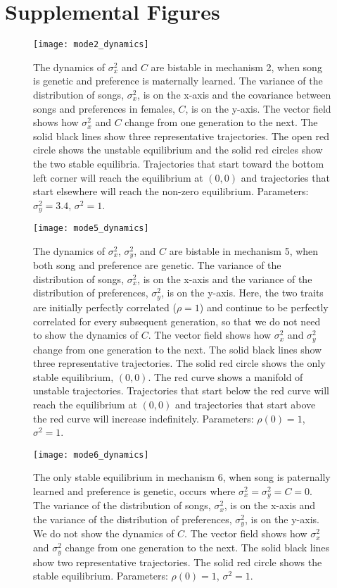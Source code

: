 \documentclass{article}
\begin{document}
\newpage
\section{Supplemental Figures}

\begin{figure}[ht]
\texttt{[image: mode2\_dynamics]}
\caption{\label{mode2} The dynamics of $\sigma_x^2$ and $C$ are bistable in mechanism 2, when song is genetic and preference is maternally learned. The variance of the distribution of songs, $\sigma_x^2$, is on the x-axis and the covariance between songs and preferences in females, $C$, is on the y-axis. The vector field shows how $\sigma_x^2$ and $C$ change from one generation to the next. The solid black lines show three representative trajectories. The open red circle shows the unstable equilibrium and the solid red circles show the two stable equilibria. Trajectories that start toward the bottom left corner will reach the equilibrium at $(0,0)$ and trajectories that start elsewhere will reach the non-zero equilibrium. Parameters: $\sigma_y^2=3.4$, $\sigma^2=1$.}
\end{figure}

\begin{figure}
\texttt{[image: mode5\_dynamics]}
\caption{\label{mode5}The dynamics of $\sigma_x^2$, $\sigma_y^2$, and $C$ are bistable in mechanism 5, when both song and preference are genetic. The variance of the distribution of songs, $\sigma_x^2$, is on the x-axis and the variance of the distribution of preferences, $\sigma_y^2$, is on the y-axis. Here, the two traits are initially perfectly correlated ($\rho=1$) and continue to be perfectly correlated for every subsequent generation, so that we do not need to show the dynamics of $C$. The vector field shows how $\sigma_x^2$ and $\sigma_y^2$ change from one generation to the next. The solid black lines show three representative trajectories. The solid red circle shows the only stable equilibrium, $(0,0)$. The red curve shows a manifold of unstable trajectories. Trajectories that start below the red curve will reach the equilibrium at $(0,0)$ and trajectories that start above the red curve will increase indefinitely. Parameters:  $\rho(0)=1$, $\sigma^2=1$.}
\end{figure}


\begin{figure}
\texttt{[image: mode6\_dynamics]}
\caption{\label{mode6} 
The only stable equilibrium in mechanism 6, when song is paternally learned and preference is genetic,  occurs where $\sigma_x^2=\sigma_y^2=C=0$. The variance of the distribution of songs, $\sigma_x^2$, is on the x-axis and the variance of the distribution of preferences, $\sigma_y^2$, is on the y-axis. We do not show the dynamics of $C$. The vector field shows how $\sigma_x^2$ and $\sigma_y^2$ change from one generation to the next. The solid black lines show two representative trajectories. The solid red circle shows the stable equilibrium. Parameters: $\rho(0)=1$, $\sigma^2=1$.}
\end{figure}
\end{document}
